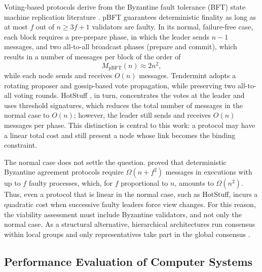 \documentclass[english]{sbc2025}%
\begin{document}
Voting-based protocols derive from the Byzantine fault tolerance (BFT) state machine replication literature \citep{Vukolic2015}. pBFT \citep{Castro1999} guarantees deterministic finality as long as at most $f$ out of $n \geq 3f+1$ validators are faulty. In its normal, failure-free case, each block requires a pre-prepare phase, in which the leader sends $n-1$ messages, and two all-to-all broadcast phases (prepare and commit), which results in a number of messages per block of the order of
\begin{equation}
M_{\mathrm{pBFT}}(n) \approx 2n^{2},
\label{eq:mpbft}
\end{equation}
while each node sends and receives $O(n)$ messages. Tendermint \citep{Buchman2018} adopts a rotating proposer and gossip-based vote propagation, while preserving two all-to-all voting rounds. HotStuff \citep{Yin2019}, in turn, concentrates the votes at the leader and uses threshold signatures, which reduces the total number of messages in the normal case to $O(n)$; however, the leader still sends and receives $O(n)$ messages per phase. This distinction is central to this work: a protocol may have a linear total cost and still present a node whose link becomes the binding constraint.

The normal case does not settle the question. \citet{Dolev1985} proved that deterministic Byzantine agreement protocols require $\Omega(n + f^{2})$ messages in executions with up to $f$ faulty processes, which, for $f$ proportional to $n$, amounts to $\Omega(n^{2})$. Thus, even a protocol that is linear in the normal case, such as HotStuff, incurs a quadratic cost when successive faulty leaders force view changes. For this reason, the viability assessment must include Byzantine validators, and not only the normal case. As a structural alternative, hierarchical architectures run consensus within local groups and only representatives take part in the global consensus \citep{Amir2010}.

\subsection{Performance Evaluation of Computer Systems}
\end{document}
